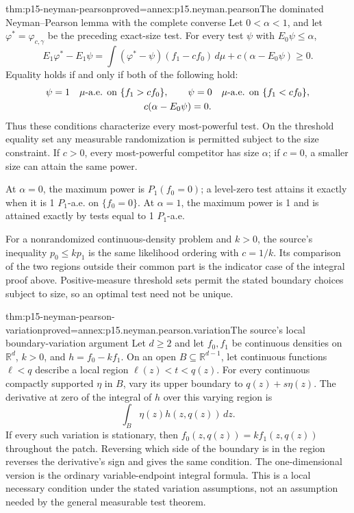 \begin{hbtheorem}{thm:p15-neyman-pearson}{proved=annex:p15.neyman.pearson}{The dominated Neyman--Pearson lemma with the complete converse}
Let \(0<\alpha<1\), and let \(\varphi^*=\varphi_{c,\gamma}\)
be the preceding exact-size test. For every test \(\psi\)
with \(E_0\psi\leq\alpha\),
\[
 E_1\varphi^*-E_1\psi
 =\int(\varphi^*-\psi)(f_1-cf_0)\,d\mu
                         +c(\alpha-E_0\psi)\geq0.
\]
Equality holds if and only if both of the following hold:
\[
\begin{gathered}
 \psi=1\quad\mu\hbox{-a.e. on }\{f_1>cf_0\},\qquad
 \psi=0\quad\mu\hbox{-a.e. on }\{f_1<cf_0\},\\
                              c(\alpha-E_0\psi)=0.
\end{gathered}
\]
Thus these conditions characterize every most-powerful test.
On the threshold equality set any measurable randomization is
permitted subject to the size constraint. If \(c>0\), every
most-powerful competitor has size \(\alpha\); if \(c=0\),
a smaller size can attain the same power.

At \(\alpha=0\), the maximum power is \(P_1(f_0=0)\);
a level-zero test attains it exactly when it is 1
\(P_1\)-a.e. on \(\{f_0=0\}\).
At \(\alpha=1\), the maximum power is 1 and is attained
exactly by tests equal to 1 \(P_1\)-a.e.
\end{hbtheorem}

For a nonrandomized continuous-density problem and \(k>0\),
the source's inequality \(p_0\leq kp_1\) is the same
likelihood ordering with \(c=1/k\). Its comparison of the
two regions outside their common part is the indicator
case of the integral proof above. Positive-measure
threshold sets permit the stated boundary choices
subject to size, so an optimal test need not be unique.

\begin{hblemma}{thm:p15-neyman-pearson-variation}{proved=annex:p15.neyman.pearson.variation}{The source's local boundary-variation argument}
Let \(d\geq2\) and let \(f_0,f_1\) be continuous densities on \(\mathbb R^d\),
\(k>0\), and \(h=f_0-kf_1\). On an open
\(B\subseteq\mathbb R^{d-1}\), let continuous functions
\(\ell<q\) describe a local region
\(\ell(z)<t<q(z)\).
For every continuous compactly supported \(\eta\) in \(B\),
vary its upper boundary to \(q(z)+s\eta(z)\).
The derivative at zero of the integral of \(h\) over
this varying region is
\[
                         \int_B\eta(z)h(z,q(z))\,dz.
\]
If every such variation is stationary, then
\(f_0(z,q(z))=k f_1(z,q(z))\) throughout the patch.
Reversing which side of the boundary is in the region
reverses the derivative's sign and gives the same condition.
The one-dimensional version is the ordinary variable-endpoint
integral formula. This is a local necessary condition under
the stated variation assumptions, not an assumption needed
by the general measurable test theorem.
\end{hblemma}

